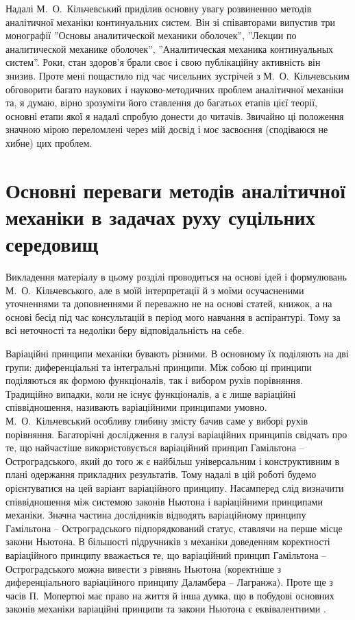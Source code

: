 \documentclass[11pt, reqno]{amsart}
\begin{document}
Надалі М.~О.~Кільчевський приділив основну увагу розвиненню методів аналітичної механіки континуальних систем. Він зі співавторами випустив три монографії ''Основы аналитической механики оболочек'', ''Лекции по аналитической механике оболочек'', ''Аналитическая механика континуальных систем''. Роки, стан здоров'я брали своє і свою публікаційну активність він знизив. Проте мені пощастило під час чисельних зустрічей з М.~О.~Кільчевським обговорити багато наукових і науково-методичних проблем аналітичної механіки та, я думаю, вірно зрозуміти його ставлення до багатьох етапів цієї теорії, основні етапи якої я надалі спробую донести до читачів. Звичайно ці положення значною мірою переломлені через мій досвід і моє засвоєння (сподіваюся не хибне) цих проблем.

\section{Основні переваги методів аналітичної механіки в задачах руху суцільних середовищ}
Викладення матеріалу в цьому розділі проводиться на основі ідей і формулювань М.~О.~Кільчевського, але в моїй інтерпретації й з моїми осучасненими уточненнями та доповненнями й переважно не на основі статей, книжок, а на основі бесід під час консультацій в період мого навчання в аспірантурі. Тому за всі неточності та недоліки беру відповідальність на себе.

Варіаційні принципи механіки бувають різними. В основному їх поділяють на дві групи: диференціальні та інтегральні принципи. Між собою ці принципи поділяються як формою функціоналів, так і вибором рухів порівняння. Традиційно випадки, коли не існує функціоналів, а є лише варіаційні співвідношення, називають варіаційними принципами умовно.
М.~О.~Кільчевський особливу глибину змісту бачив саме у виборі рухів порівняння. Багаторічні дослідження в галузі варіаційних принципів свідчать про те, що найчастіше використовується варіаційний принцип Гамільтона -- Остроградського, який до того ж є найбільш універсальним і конструктивним в плані одержання прикладних результатів. Тому надалі в цій роботі будемо орієнтуватися на цей варіант варіаційного принципу. Насамперед слід визначити співвідношення між системою законів Ньютона і варіаційними принципами механіки. Значна частина дослідників відводять варіаційному принципу  Гамільтона -- Остроградського підпорядкований статус, ставлячи на перше місце закони Ньютона. В більшості підручників з механіки доведенням коректності варіаційного принципу вважається те, що варіаційний принцип Гамільтона -- Остроградського можна вивести з рівнянь Ньютона (коректніше з диференціального варіаційного принципу Даламбера -- Лагранжа). Проте ще з часів П.~Мопертюі має право на життя й інша думка, що в побудові основних законів механіки варіаційні принципи та закони Ньютона є еквівалентними \cite{Pol}.
\end{document}
